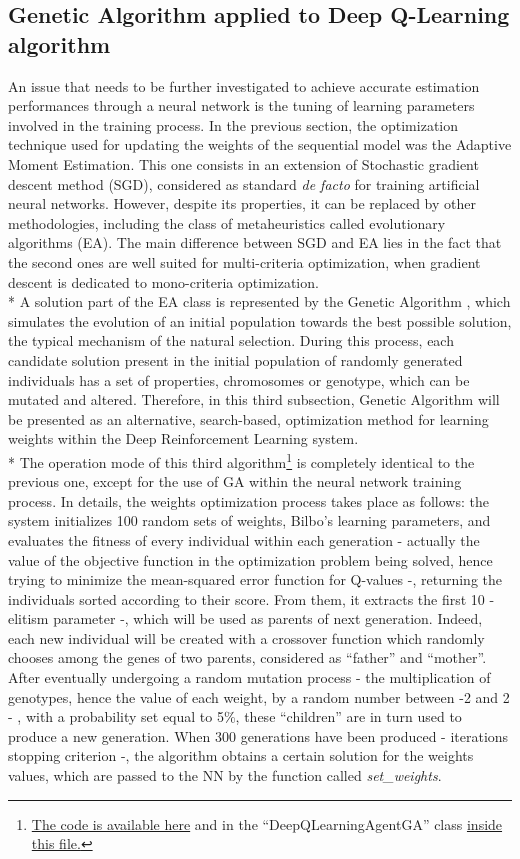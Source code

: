 \subsection{Genetic Algorithm applied to Deep Q-Learning algorithm}
An issue that needs to be further investigated to achieve accurate estimation performances through a neural network is the tuning of learning parameters involved in the training process. In the previous section, the optimization technique used for updating the weights of the sequential model was the Adaptive Moment Estimation. This one consists in an extension of Stochastic gradient descent method (SGD), considered as standard \textit{de facto} for training artificial neural networks. However, despite its properties, it can be replaced by other methodologies, including the class of metaheuristics called evolutionary algorithms (EA). The main difference between SGD and EA lies in the fact that the second ones are well suited for multi-criteria optimization, when gradient descent is dedicated to mono-criteria optimization.\\*
A solution part of the EA class is represented by the Genetic Algorithm \cite{7}, which simulates the evolution of an initial population towards the best possible solution, the typical mechanism of the natural selection. During this process, each candidate solution present in the initial population of randomly generated individuals has a set of properties, chromosomes or genotype, which can be mutated and altered. 
Therefore, in this third subsection, Genetic Algorithm will be presented as an alternative, search-based, optimization method for learning weights within the Deep Reinforcement Learning system.\\*
The operation mode of this third algorithm\footnote{\href{https://github.com/moiraghif/DragonHunting/blob/master/Bilbo\%20World/Bilbo_ga_deep_feels.py}{The code is available here} and in the ``DeepQLearningAgentGA'' class \href{https://github.com/moiraghif/DragonHunting/blob/master/Bilbo\%20World/agents.py}{inside this file.}} is completely identical to the previous one, except for the use of GA within the neural network training process. In details, the weights optimization process takes place as follows: the system initializes 100 random sets of weights, Bilbo's learning parameters, and evaluates the fitness of every individual within each generation - actually the value of the objective function in the optimization problem being solved, hence trying to minimize the mean-squared error function for Q-values -, returning the individuals sorted according to their score. From them, it extracts the first 10 - elitism parameter -, which will be used as parents of next generation. Indeed, each new individual will be created with a crossover function which randomly chooses among the genes of two parents, considered as ``father'' and ``mother''. After eventually undergoing a random mutation process - the multiplication of genotypes, hence the value of each weight, by a random number between -2 and 2 - , with a probability set equal to 5\%, these ``children'' are in turn used to produce a new generation. When 300 generations have been produced - iterations stopping criterion -, the algorithm obtains a certain solution for the weights values, which are passed to the NN by the function called \textit{set\_weights}. 
